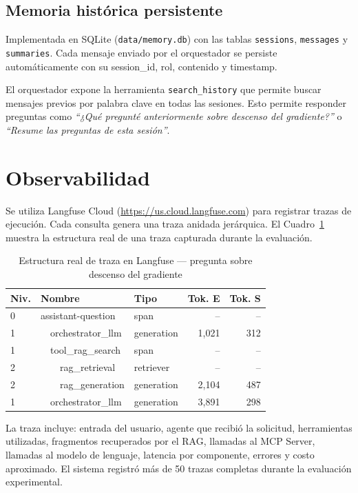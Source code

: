 \documentclass[conference]{IEEEtran}
\begin{document}
\subsection{Memoria histórica persistente}

Implementada en SQLite (\texttt{data/memory.db}) con las tablas \texttt{sessions}, \texttt{messages} y \texttt{summaries}. Cada mensaje enviado por el orquestador se persiste automáticamente con su session\_id, rol, contenido y timestamp.

El orquestador expone la herramienta \texttt{search\_history} que permite buscar mensajes previos por palabra clave en todas las sesiones. Esto permite responder preguntas como \textit{``¿Qué pregunté anteriormente sobre descenso del gradiente?''} o \textit{``Resume las preguntas de esta sesión''}.

\section{Observabilidad}

Se utiliza Langfuse Cloud (\url{https://us.cloud.langfuse.com}) para registrar trazas de ejecución. Cada consulta genera una traza anidada jerárquica. El Cuadro~\ref{tab:trace_structure} muestra la estructura real de una traza capturada durante la evaluación.

\begin{table}[htbp]
\caption{Estructura real de traza en Langfuse — pregunta sobre descenso del gradiente}
\label{tab:trace_structure}
\begin{tabular}{@{}p{0.4cm}p{2.8cm}p{1.5cm}rr@{}}
\toprule
\textbf{Niv.} & \textbf{Nombre} & \textbf{Tipo} & \textbf{Tok. E} & \textbf{Tok. S} \\
\midrule
0 & assistant-question & span & -- & -- \\
1 & \ \ orchestrator\_llm & generation & 1{,}021 & 312 \\
1 & \ \ tool\_rag\_search & span & -- & -- \\
2 & \ \ \ \ rag\_retrieval & retriever & -- & -- \\
2 & \ \ \ \ rag\_generation & generation & 2{,}104 & 487 \\
1 & \ \ orchestrator\_llm & generation & 3{,}891 & 298 \\
\bottomrule
\end{tabular}
\end{table}

La traza incluye: entrada del usuario, agente que recibió la solicitud, herramientas utilizadas, fragmentos recuperados por el RAG, llamadas al MCP Server, llamadas al modelo de lenguaje, latencia por componente, errores y costo aproximado. El sistema registró más de 50 trazas completas durante la evaluación experimental.
\end{document}
